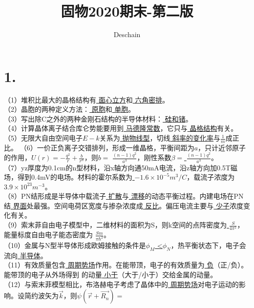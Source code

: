 \documentclass[UTF8]{ctexart}
\title{固物2020期末-第二版}
\author{Deschain}
\begin{document}
\maketitle
\section*{1.}
（1）堆积比最大的晶格结构有\uline{\color{white} 面心立方}和\uline{\color{white} 六角密排}。\\
（2）晶胞的两种定义方法：\uline{\color{white} 原胞}和\uline{\color{white} 单胞}。\\
（3）写出除C之外的两种金刚石结构的半导体材料：\uline{\color{white} 硅和锗}。\\
（4）计算晶体离子结合库仑势能要用到\uline{\color{white} 马德隆常数}，它只与\uline{\color{white} 晶格结构}有关。\\
（5）无限大自由空间电子$E-k$关系为\uline{\color{white} 抛物线型}，切线\uline{\color{white} 斜率的变化率}与$\frac{1}{m}$成正比。
（6）一价正负离子交错排列，形成一维晶格，平衡间距为$a$，只计近邻原子的作用，$U(r)=-\frac{q^2}{r}+\frac{b}{r^n}$，则$b=$
\uline{\color{white} $\frac{(n-1)q^2}{a^3}$}，刚性系数$\beta=$\uline{\color{white} $\frac{(n-1)q^2}{a^3}$}。\\
（7）yz厚度为0.1cm的n型材料，沿x轴方向通50mA电流，沿z轴方向加0.5T磁场，得到0.4mV的电场。材料的霍尔系数为\uline{\color{white} 
$-1.6\times10^{-5}m^3/C$}，载流子浓度为\uline{\color{white} $3.9\times10^{23}m^{-3}$}。\\
（8）PN结形成是半导体中载流子\uline{\color{white} 扩散}与\uline{\color{white} 漂移}的动态平衡过程。内建电场在PN结\uline{\color{white}
 界面}处最强。空间电荷区宽度与掺杂浓度成\uline{\color{white} 反比}。偏压电流主要与\uline{\color{white} 少子}浓度变化有关。\\
（9）索末菲自由电子模型中，二维材料的面积为S，则k空间的点阵密度为\uline{\color{white} $\frac{S}{4\pi^2}$}，能量标度自由电子能态密度为
\uline{\color{white} $\frac{Sm}{\pi\hbar^2}$}。\\
（10）金属与N型半导体形成欧姆接触的条件是$\phi_M$\uline{\color{white} <}$\phi_N$，热平衡状态下，电子会流向\uline{\color{white} 半导体}。\\
（11）有效质量包含\uline{\color{white} 周期势场}作用。在能带顶，电子的有效质量为\uline{\color{white} 负}（正/负）。能带顶的电子从外场得到
的动量\uline{\color{white} 小于}（大于/小于）交给金属的动量。\\
（12）与索末菲模型相比，布洛赫电子考虑了晶体中的\uline{\color{white} 周期势场}对电子运动的影响。设简约波矢为$\vec{k}$，则$\psi(\vec{r}+\vec{R_n})=$
\end{document}
